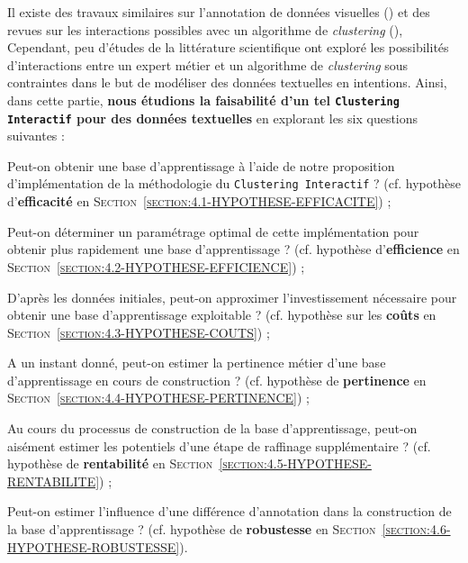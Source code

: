 	Il existe des travaux similaires sur l'annotation de données visuelles (\cite{lampert-etal:2019:constrained-distance-based}) et des revues sur les interactions possibles avec un algorithme de \textit{clustering} (\cite{bae-etal:2021:interactive-clustering-comprehensive}),
	Cependant, peu d'études de la littérature scientifique ont exploré les possibilités d'interactions entre un expert métier et un algorithme de \textit{clustering} sous contraintes dans le but de modéliser des données textuelles en intentions.
	Ainsi, dans cette partie, \textbf{nous étudions la faisabilité d'un tel \texttt{Clustering Interactif} pour des données textuelles} en explorant les six questions suivantes :
	\begin{leftBarImportantRed}
		\begin{todolist}
			\item Peut-on obtenir une base d'apprentissage à l'aide de notre proposition d'implémentation de la méthodologie du \texttt{Clustering Interactif} ? (cf. hypothèse d'\textbf{efficacité} en \textsc{Section~\ref{section:4.1-HYPOTHESE-EFFICACITE}}) ;
			\item Peut-on déterminer un paramétrage optimal de cette implémentation pour obtenir plus rapidement une base d'apprentissage ? (cf. hypothèse d'\textbf{efficience} en \textsc{Section~\ref{section:4.2-HYPOTHESE-EFFICIENCE}}) ;
			\item D'après les données initiales, peut-on approximer l'investissement nécessaire pour obtenir une base d'apprentissage exploitable ? (cf. hypothèse sur les \textbf{coûts} en \textsc{Section~\ref{section:4.3-HYPOTHESE-COUTS}}) ;
			\item A un instant donné, peut-on estimer la pertinence métier d'une base d'apprentissage en cours de construction ? (cf. hypothèse de \textbf{pertinence} en \textsc{Section~\ref{section:4.4-HYPOTHESE-PERTINENCE}}) ;
			\item Au cours du processus de construction de la base d'apprentissage, peut-on aisément estimer les potentiels d'une étape de raffinage supplémentaire ? (cf. hypothèse de \textbf{rentabilité} en \textsc{Section~\ref{section:4.5-HYPOTHESE-RENTABILITE}}) ;
			\item Peut-on estimer l'influence d'une différence d'annotation dans la construction de la base d'apprentissage ? (cf. hypothèse de \textbf{robustesse} en \textsc{Section~\ref{section:4.6-HYPOTHESE-ROBUSTESSE}}).
		\end{todolist}
	\end{leftBarImportantRed}
	
